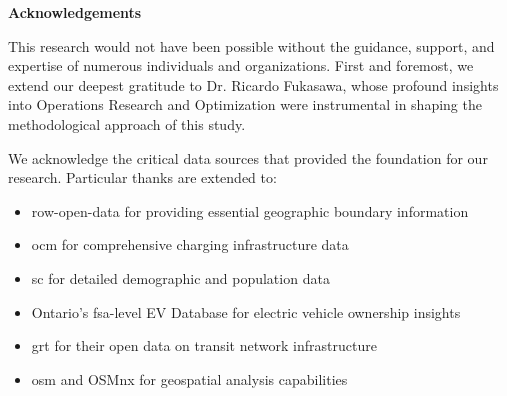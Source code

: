 \begin{center}\textbf{Acknowledgements}\end{center}

This research would not have been possible without the guidance, support, and expertise of numerous individuals and organizations. First and foremost, we extend our deepest gratitude to Dr. Ricardo Fukasawa, whose profound insights into Operations Research and Optimization were instrumental in shaping the methodological approach of this study.

We acknowledge the critical data sources that provided the foundation for our research. Particular thanks are extended to:

\begin{itemize}
    \item \gls{row-open-data} for providing essential geographic boundary information
    \item \gls{ocm} for comprehensive charging infrastructure data
    \item \gls{sc} for detailed demographic and population data
    \item Ontario's \gls{fsa}-level EV Database for electric vehicle ownership insights
    \item \gls{grt} for their open data on transit network infrastructure
    \item \gls{osm} and OSMnx \cite{boeing2024} for geospatial analysis capabilities
\end{itemize}

\cleardoublepage
{}    %

\renewcommand\contentsname{Table of Contents}
\tableofcontents
\cleardoublepage
{}    %

\listoffigures
\cleardoublepage
{}		%

\listoftables
\cleardoublepage
{}		%

\renewcommand*{\abbreviationsname}{List of Abbreviations}
\printglossary[type=abbreviations]
\cleardoublepage
{}		%

\printglossary[type=symbols]
\cleardoublepage
{}		%



